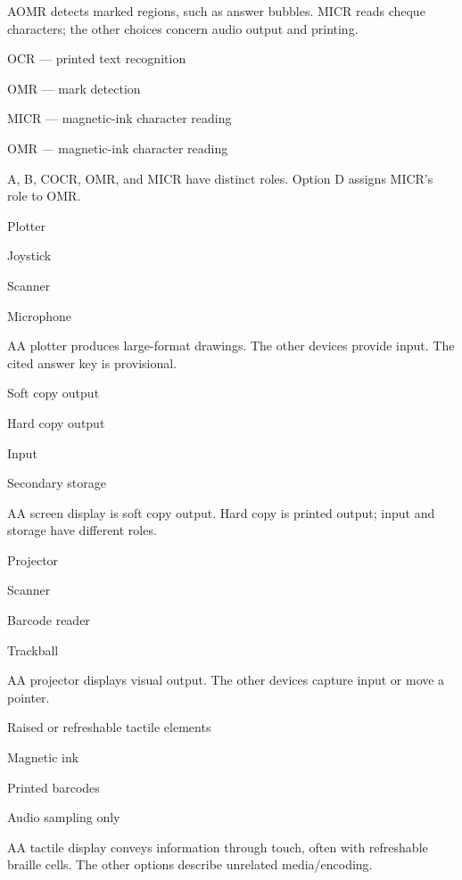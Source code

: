 \begin{enumerate}[label=\textbf{Q\arabic*.}, leftmargin=*]
  {A}{OMR detects marked regions, such as answer bubbles. MICR reads cheque characters; the other choices concern audio output and printing.}
  {\item OCR --- printed text recognition
   \item OMR --- mark detection
   \item MICR --- magnetic-ink character reading
   \item OMR --- magnetic-ink character reading}
  {A, B, C}{OCR, OMR, and MICR have distinct roles. Option D assigns MICR's role to OMR.}
\fi
\ifnum{}
  {\item Plotter
   \item Joystick
   \item Scanner
   \item Microphone}
  {A}{A plotter produces large-format drawings. The other devices provide input. The cited answer key is provisional.}
  {\item Soft copy output
   \item Hard copy output
   \item Input
   \item Secondary storage}
  {A}{A screen display is soft copy output. Hard copy is printed output; input and storage have different roles.}
  {\item Projector
   \item Scanner
   \item Barcode reader
   \item Trackball}
  {A}{A projector displays visual output. The other devices capture input or move a pointer.}
  {\item Raised or refreshable tactile elements
   \item Magnetic ink
   \item Printed barcodes
   \item Audio sampling only}
  {A}{A tactile display conveys information through touch, often with refreshable braille cells. The other options describe unrelated media/encoding.}

\end{enumerate}
